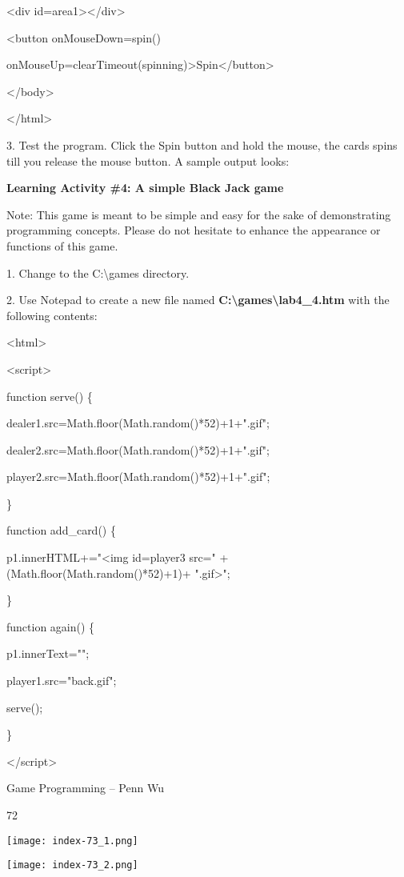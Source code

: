 \documentclass[
]{article}
\begin{document}
\textless div id=area1\textgreater\textless/div\textgreater{}

\textless button onMouseDown=spin()

onMouseUp=clearTimeout(spinning)\textgreater Spin\textless/button\textgreater{}

\textless/body\textgreater{}

\textless/html\textgreater{}

3. Test the program. Click the Spin button and hold the mouse, the cards
spins till you release the mouse button. A sample output looks:

\textbf{Learning Activity \#4: A simple Black Jack game}

Note: This game is meant to be simple and easy for the sake of
demonstrating programming concepts. Please do not hesitate to enhance
the appearance or functions of this game.

1. Change to the C:\textbackslash games directory.

2. Use Notepad to create a new file named
\textbf{C:\textbackslash games\textbackslash lab4\_4.htm} with the
following contents:

\textless html\textgreater{}

\textless script\textgreater{}

function serve() \{

dealer1.src=Math.floor(Math.random()*52)+1+".gif";

dealer2.src=Math.floor(Math.random()*52)+1+".gif";

player2.src=Math.floor(Math.random()*52)+1+".gif";

\}

function add\_card() \{

p1.innerHTML+="\textless img id=player3 src=" +
(Math.floor(Math.random()*52)+1)+ ".gif\textgreater";

\}

function again() \{

p1.innerText="";

player1.src="back.gif";

serve();

\}

\textless/script\textgreater{}

Game Programming -- Penn Wu

72

\protect\hypertarget{index_split_005.htmlux5cux23p73}{}{}\texttt{[image: index-73\_1.png]}

\texttt{[image: index-73\_2.png]}
\end{document}

